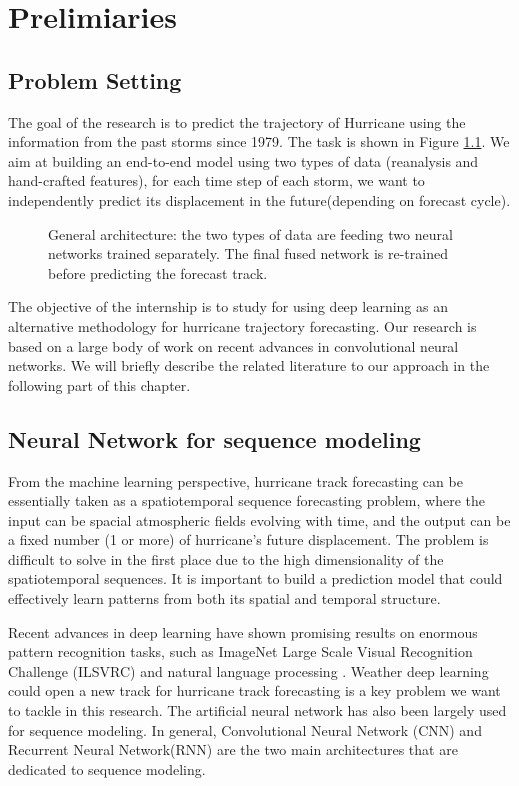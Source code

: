 \chapter{Prelimiaries}

\section{Problem Setting}
The goal of the research is to predict the trajectory of Hurricane using the information from the past storms since 1979. The task is shown in Figure \ref{fig::task}. We aim at building an end-to-end model using two types of data (reanalysis and hand-crafted features), for each time step of each storm, we want to independently predict its displacement in the future(depending on forecast cycle). 

\begin{figure}[H]
	\begin{center}
		\hsize {}
	\end{center}
	\caption{General architecture: the two types of data are feeding two neural networks trained separately. The final fused network is re-trained before predicting the forecast track. }
	\label{fig::task}
\end{figure}

The objective of the internship is to study for using deep learning as an alternative methodology for hurricane trajectory forecasting. Our research is based on a large body of work on recent advances in convolutional neural networks. We will briefly describe the related literature to our approach in the following part of this chapter.  

\section{Neural Network for sequence modeling}
From the machine learning perspective, hurricane track forecasting can be essentially taken as a spatiotemporal sequence forecasting problem, where the input can be spacial atmospheric fields evolving with time, and the output can be a fixed number (1 or more) of hurricane's future displacement. The problem is difficult to solve in the first place due to the high dimensionality of the spatiotemporal sequences. It is important to build a prediction model that could effectively learn patterns from both its spatial and temporal structure. 

Recent advances in deep learning have shown promising results on enormous pattern recognition tasks, such as ImageNet Large Scale Visual Recognition Challenge (ILSVRC) \cite{russakovsky2015imagenet} \cite{krizhevsky2012imagenet}  \cite{szegedy2015going} and natural language processing \cite{goldberg2014word2vec} \cite{sutskever2014sequence}. Weather deep learning could open a new track for hurricane track forecasting is a key problem we want to tackle in this research. The artificial neural network has also been largely used for sequence modeling. In general, Convolutional Neural Network (CNN) and Recurrent Neural Network(RNN) are the two main architectures that are dedicated to sequence modeling. 

